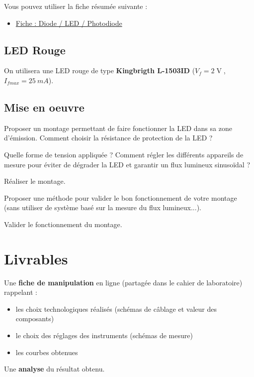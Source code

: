Vous pouvez utiliser la fiche résumée suivante : 

\begin{itemize}
	\item \hyperref[fiche:Led]{Fiche : Diode / LED / Photodiode}
\end{itemize}


\subsection{LED Rouge}

On utilisera une LED rouge de type \textbf{Kingbrigth L-1503ID} ($V_f = 2\operatorname{V}$, $I_{fmax} = 25~mA$).

\subsection{Mise en oeuvre}

\Quest Proposer un montage permettant de faire fonctionner la LED dans sa zone d'émission. Comment choisir la résistance de protection de la LED ? 

\Quest Quelle forme de tension appliquée ? Comment régler les différents appareils de mesure pour éviter de dégrader la LED et garantir un flux lumineux sinusoïdal ?

\Manip Réaliser le montage.

\Quest Proposer une méthode pour valider le bon fonctionnement de votre montage (sans utiliser de système basé sur la mesure du flux lumineux...).

\Manip Valider le fonctionnement du montage.

\section{Livrables}


Une \textbf{fiche de manipulation} en ligne (partagée dans le cahier de laboratoire) rappelant :

\begin{itemize}
	\item les choix technologiques réalisés (schémas de câblage et valeur des composants)
	\item le choix des réglages des instruments (schémas de mesure)
	\item les courbes obtenues
\end{itemize}

Une \textbf{analyse} du résultat obtenu.


